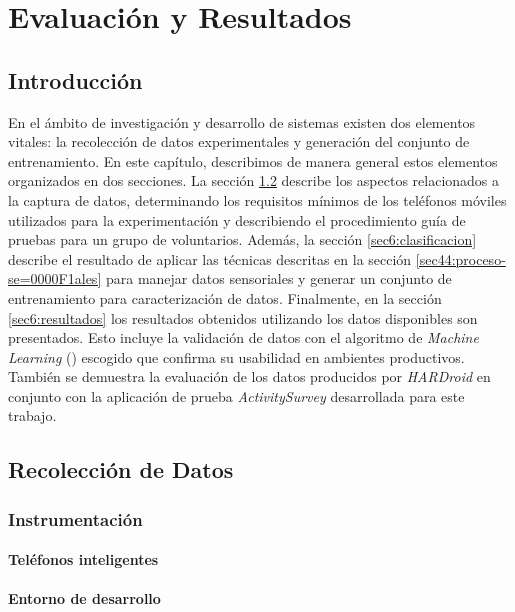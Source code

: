 
\chapter{Evaluación y Resultados}

\label{chap6:evaluacion}

\section{Introducción}

En el ámbito de investigación y desarrollo de sistemas 
existen dos elementos vitales: la recolección de datos experimentales
y generación del conjunto de entrenamiento. En este capítulo, describimos
de manera general estos elementos organizados en dos secciones. La
sección \ref{sec6:recoleccion} describe los aspectos relacionados
a la captura de datos, determinando los requisitos mínimos de los
teléfonos móviles utilizados para la experimentación y describiendo
el procedimiento guía de pruebas para un grupo de voluntarios. Además,
la sección \ref{sec6:clasificacion} describe el resultado de aplicar
las técnicas descritas en la sección \ref{sec44:proceso-se=0000F1ales}
para manejar datos sensoriales y generar un conjunto de entrenamiento
para caracterización de datos. Finalmente, en la sección \ref{sec6:resultados}
los resultados obtenidos utilizando los datos disponibles son presentados.
Esto incluye la validación de datos con el algoritmo de \emph{Machine
Learning} () escogido que confirma su usabilidad en ambientes
productivos. También se demuestra la evaluación de los datos producidos
por \emph{HARDroid }en conjunto con la aplicación de prueba \emph{ActivitySurvey}
desarrollada para este trabajo.

\section{Recolección de Datos}

\label{sec6:recoleccion}

\subsection{Instrumentación}

\subsubsection{Teléfonos inteligentes}

\subsubsection{Entorno de desarrollo }

